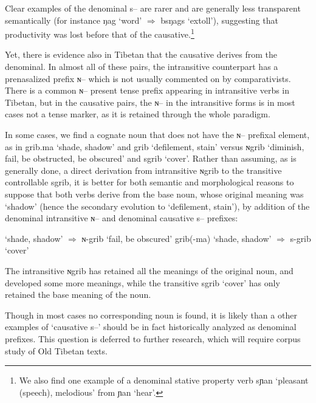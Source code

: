 \documentclass[oldfontcommands,oneside,a4paper,11pt]{article}
\newcommand{\ipa}[1]{{\phon \mbox{#1}}} %
\begin{document}
Clear examples of the denominal \ipa{s--} are rarer and are generally less transparent semantically (for instance \ipa{ŋag} `word' $\Rightarrow$ \ipa{bsŋags} `extoll'), suggesting that productivity was lost before that of the causative.\footnote{We also find one example of a denominal stative property verb \ipa{sɲan} `pleasant (speech), melodious' from \ipa{ɲan} `hear'. }

Yet, there is evidence also in Tibetan that the causative derives from the denominal.  In almost all of these pairs, the intransitive counterpart has a prenasalized prefix \ipa{ɴ--} which is not usually commented on by comparativists. There is a common  \ipa{ɴ--} present tense prefix appearing in intransitive verbs in Tibetan, but in the causative pairs, the  \ipa{ɴ--} in the intransitive forms is in most cases not a tense marker, as it is retained through the whole paradigm.

 In some cases, we find a cognate noun that does not have the  \ipa{ɴ--} prefixal element, as in \ipa{grib.ma} `shade, shadow'  and \ipa{grib} `defilement, stain' versus \ipa{ɴgrib} `diminish, fail, be obstructed, be obscured' and  \ipa{sgrib} `cover'. Rather than assuming, as is generally done, a direct derivation from intransitive  \ipa{ɴgrib}  to the transitive controllable \ipa{sgrib}, it is better for both semantic and morphological reasons to suppose that both verbs derive from the base noun, whose original meaning was `shadow' (hence the secondary evolution to `defilement, stain'), by addition of the denominal intransitive \ipa{ɴ--} and denominal causative \ipa{s--} prefixes:
 
\begin{exe}
\ex \label{exgrib}
\glt  \ipa{grib(-ma)} `shade, shadow'  $\Rightarrow$   \ipa{ɴ-grib} `fail, be obscured'
\glt 
 \ipa{grib(-ma)} `shade, shadow'  $\Rightarrow$   \ipa{s-grib} `cover'
\end{exe}

The intransitive \ipa{ɴgrib} has retained all the meanings of the original noun, and developed some more meanings, while the transitive \ipa{sgrib} `cover' has only retained the base meaning of the noun.  

Though in most cases no corresponding noun is found, it is likely than a other examples of  `causative \ipa{s--}' should be in fact historically analyzed as denominal prefixes. This question is deferred to further research, which will require corpus study of Old Tibetan texts.
\end{document}

